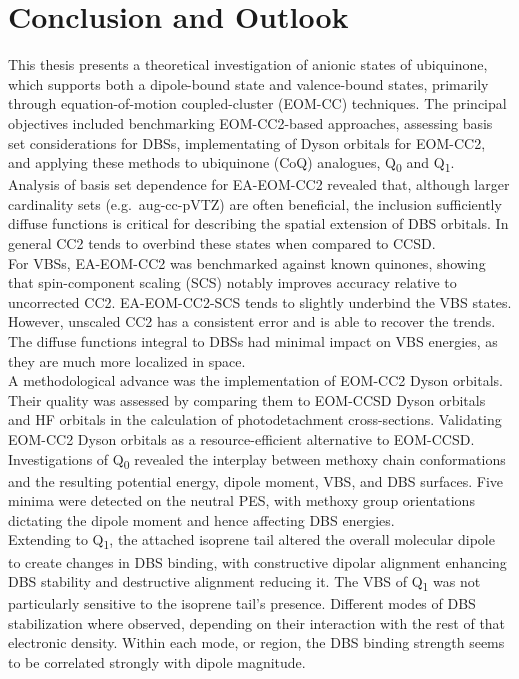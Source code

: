 \chapter{Conclusion and Outlook}\label{ch:conclusion}
This thesis presents a theoretical investigation of anionic states of ubiquinone, which supports both a dipole-bound state and valence-bound states, primarily through equation-of-motion coupled-cluster (EOM-CC) techniques. The principal objectives included benchmarking EOM-CC2-based approaches, assessing basis set considerations for DBSs, implementating of Dyson orbitals for EOM-CC2, and applying these methods to ubiquinone (CoQ) analogues, Q\textsubscript{0} and Q\textsubscript{1}.\\

Analysis of basis set dependence for EA-EOM-CC2 revealed that, although larger cardinality sets (e.g.\ aug-cc-pVTZ) are often beneficial, the inclusion sufficiently diffuse functions is critical for describing the spatial extension of DBS orbitals. In general CC2 tends to overbind these states when compared to CCSD.\\

For VBSs, EA-EOM-CC2 was benchmarked against known quinones, showing that spin-component scaling (SCS) notably improves accuracy relative to uncorrected CC2. EA-EOM-CC2-SCS tends to slightly underbind the VBS states. However, unscaled CC2 has a consistent error and is able to recover the trends. The diffuse functions integral to DBSs had minimal impact on VBS energies, as they are much more localized in space.\\

A methodological advance was the implementation of EOM-CC2 Dyson orbitals. Their quality was assessed by comparing them to EOM-CCSD Dyson orbitals and HF orbitals in the calculation of photodetachment cross-sections. Validating EOM-CC2 Dyson orbitals as a resource-efficient alternative to EOM-CCSD.\\

Investigations of Q\textsubscript{0} revealed the interplay between methoxy chain conformations and the resulting potential energy, dipole moment, VBS, and DBS surfaces. Five minima were detected on the neutral PES, with methoxy group orientations dictating the dipole moment and hence affecting DBS energies.\\

Extending to Q\textsubscript{1}, the attached isoprene tail altered the overall molecular dipole to create changes in DBS binding, with constructive dipolar alignment enhancing DBS stability and destructive alignment reducing it. The VBS of Q\textsubscript{1} was not particularly sensitive to the isoprene tail's presence.  Different modes of DBS stabilization where observed, depending on their interaction with the rest of that electronic density. Within each mode, or region, the DBS binding strength seems to be correlated strongly with dipole magnitude.\\

